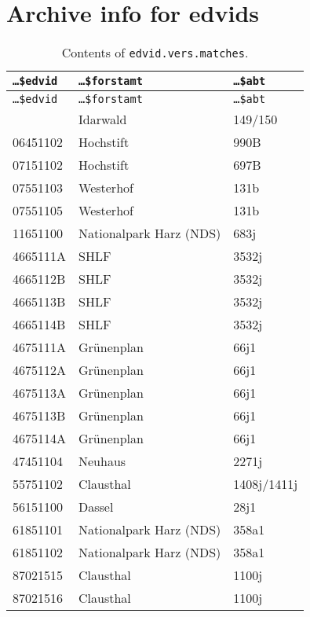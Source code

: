 \section{Archive info for edvids}

\begin{singlespace}
  {\tabulinesep=2mm
    \begin{longtabu}{l l L}
      \caption{Contents of \texttt{edvid.vers.matches}.} \\
      \toprule
      \texttt{\dots{}\$edvid} & \texttt{\dots{}\$forstamt} & \texttt{\dots{}\$abt} \\
      \midrule
      \endfirsthead
      \texttt{\dots{}\$edvid} & \texttt{\dots{}\$forstamt} & \texttt{\dots{}\$abt} \\
      \midrule
      \endhead
      \bottomrule
       & Idarwald & 149/150 \\
      06451102 & Hochstift & 990B \\
      07151102 & Hochstift & 697B \\
      07551103 & Westerhof & 131b \\
      07551105 & Westerhof & 131b \\
      11651100 & Nationalpark Harz (NDS) & 683j \\
      4665111A & SHLF & 3532j \\
      4665112B & SHLF & 3532j \\
      4665113B & SHLF & 3532j \\
      4665114B & SHLF & 3532j \\
      4675111A & Grünenplan & 66j1 \\
      4675112A & Grünenplan & 66j1 \\
      4675113A & Grünenplan & 66j1 \\
      4675113B & Grünenplan & 66j1 \\
      4675114A & Grünenplan & 66j1 \\
      47451104 & Neuhaus & 2271j \\
      55751102 & Clausthal & 1408j/1411j \\
      56151100 & Dassel & 28j1 \\
      61851101 & Nationalpark Harz (NDS) & 358a1 \\
      61851102 & Nationalpark Harz (NDS) & 358a1 \\
      87021515 & Clausthal & 1100j \\
      87021516 & Clausthal & 1100j \\

\end{longtabu}}
\end{singlespace}
